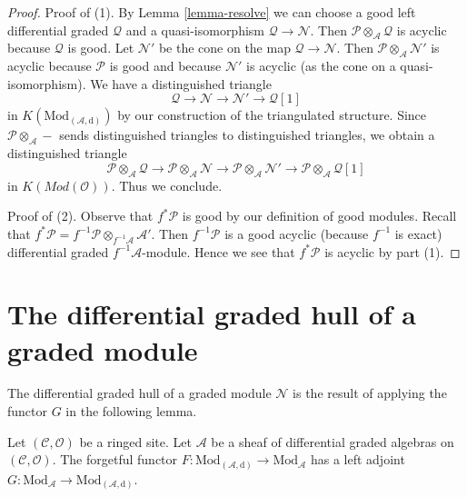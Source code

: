 \begin{proof}
Proof of (1). By Lemma \ref{lemma-resolve} we can choose a good
left differential graded $\mathcal{Q}$ and a quasi-isomorphism
$\mathcal{Q} \to \mathcal{N}$. Then
$\mathcal{P} \otimes_\mathcal{A} \mathcal{Q}$
is acyclic because $\mathcal{Q}$ is good.
Let $\mathcal{N}'$ be the cone on the map
$\mathcal{Q} \to \mathcal{N}$. Then
$\mathcal{P} \otimes_\mathcal{A} \mathcal{N}'$ is acyclic because
$\mathcal{P}$ is good and because $\mathcal{N}'$ is acyclic
(as the cone on a quasi-isomorphism). We have a distinguished
triangle
$$
\mathcal{Q} \to \mathcal{N} \to \mathcal{N}' \to \mathcal{Q}[1]
$$
in $K(\text{Mod}_{(\mathcal{A}, \text{d})})$ by our construction
of the triangulated structure. Since
$\mathcal{P} \otimes_\mathcal{A} -$ sends distinguished
triangles to distinguished triangles, we obtain a distinguished
triangle
$$
\mathcal{P} \otimes_\mathcal{A} \mathcal{Q} \to
\mathcal{P} \otimes_\mathcal{A} \mathcal{N} \to
\mathcal{P} \otimes_\mathcal{A} \mathcal{N}' \to
\mathcal{P} \otimes_\mathcal{A} \mathcal{Q}[1]
$$
in $K(\textit{Mod}(\mathcal{O}))$. Thus we conclude.

\medskip\noindent
Proof of (2). Observe that $f^*\mathcal{P}$ is good by our definition
of good modules. Recall that
$f^*\mathcal{P} = f^{-1}\mathcal{P} \otimes_{f^{-1}\mathcal{A}} \mathcal{A}'$.
Then $f^{-1}\mathcal{P}$ is a good acyclic (because $f^{-1}$ is exact)
differential graded $f^{-1}\mathcal{A}$-module. Hence
we see that $f^*\mathcal{P}$ is acyclic by part (1).
\end{proof}






\section{The differential graded hull of a graded module}
\label{section-dg-hull}

\noindent
The differential graded hull of a graded module $\mathcal{N}$ is
the result of applying the functor $G$ in the following lemma.

\begin{lemma}
\label{lemma-dg-hull}
Let $(\mathcal{C}, \mathcal{O})$ be a ringed site.
Let $\mathcal{A}$ be a sheaf of differential graded algebras
on $(\mathcal{C}, \mathcal{O})$. The forgetful functor
$F : \text{Mod}_{(\mathcal{A}, \text{d})} \to \text{Mod}_\mathcal{A}$
has a left adjoint $G : \text{Mod}_\mathcal{A} \to
\text{Mod}_{(\mathcal{A}, \text{d})}$.
\end{lemma}

